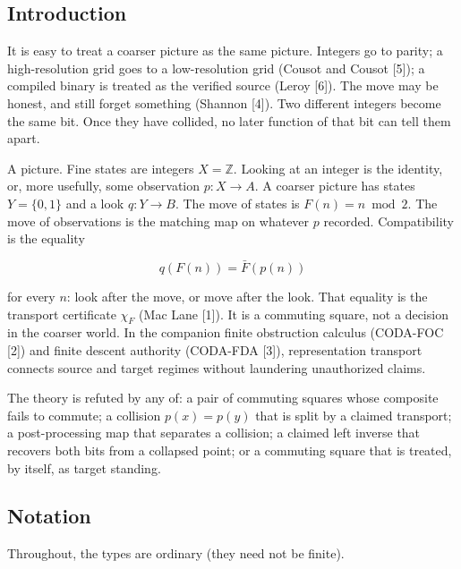 \documentclass[
  11pt,
]{article}
\begin{document}
\subsection{Introduction}\label{introduction}

It is easy to treat a coarser picture as the same picture. Integers go to parity; a high-resolution grid goes to a low-resolution grid (Cousot and Cousot {[}5{]}); a compiled binary is treated as the verified source (Leroy {[}6{]}). The move may be honest, and still forget something (Shannon {[}4{]}). Two different integers become the same bit. Once they have collided, no later function of that bit can tell them apart.

A picture. Fine states are integers \(X=\mathbb{Z}\). Looking at an integer is the identity, or, more usefully, some observation \(p:X\to A\). A coarser picture has states \(Y=\{0,1\}\) and a look \(q:Y\to B\). The move of states is \(F(n)=n\bmod 2\). The move of observations is the matching map on whatever \(p\) recorded. Compatibility is the equality

\[
q(F(n))=\bar F(p(n))
\]

for every \(n\): look after the move, or move after the look. That equality is the transport certificate \(\chi_F\) (Mac Lane {[}1{]}). It is a commuting square, not a decision in the coarser world. In the companion finite obstruction calculus (CODA-FOC {[}2{]}) and finite descent authority (CODA-FDA {[}3{]}), representation transport connects source and target regimes without laundering unauthorized claims.

The theory is refuted by any of: a pair of commuting squares whose composite fails to commute; a collision \(p(x)=p(y)\) that is split by a claimed transport; a post-processing map that separates a collision; a claimed left inverse that recovers both bits from a collapsed point; or a commuting square that is treated, by itself, as target standing.

\subsection{Notation}\label{notation}

Throughout, the types are ordinary (they need not be finite).
\end{document}
